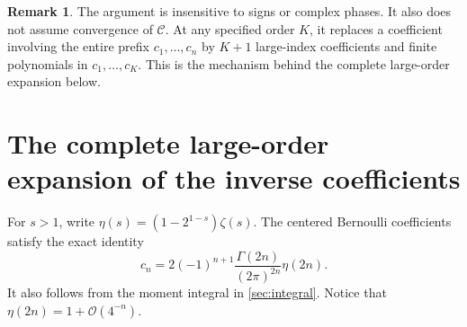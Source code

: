 \documentclass[11pt,a4paper]{article}
\theoremstyle{definition}
\newtheorem{remark}[theorem]{Remark}
\numberwithin{equation}{section}
\newcommand{\Oh}{\mathcal O}
\newcommand{\cformal}{\mathscr C}
\begin{document}
\begin{remark}
The argument is insensitive to signs or complex phases. It also does not assume convergence of $\cformal$. At any specified order $K$, it replaces a coefficient involving the entire prefix $c_1,\dots,c_n$ by $K+1$ large-index coefficients and finite polynomials in $c_1,\dots,c_K$. This is the mechanism behind the complete large-order expansion below.
\end{remark}

\section{The complete large-order expansion of the inverse coefficients}
\label{sec:late}

For $s>1$, write $\eta(s)=(1-2^{1-s})\zeta(s)$. The centered Bernoulli coefficients satisfy the exact identity
\begin{equation}
 c_n=2(-1)^{n+1}\frac{\Gamma(2n)}{(2\pi)^{2n}}\eta(2n).
 \label{eq:c-factorial}
\end{equation}
It also follows from the moment integral in \cref{sec:integral}. Notice that $\eta(2n)=1+\Oh(4^{-n})$.
\end{document}
